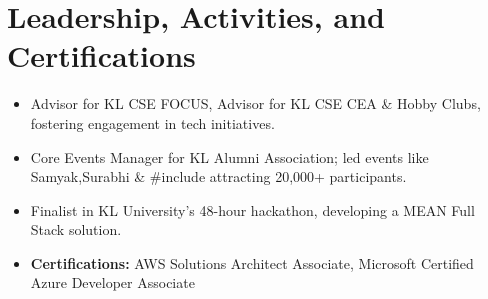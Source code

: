 \documentclass[10pt, letterpaper]{article}
\newenvironment{highlights}{
    \begin{itemize}[
        topsep=0.10 cm,
        parsep=0.10 cm,
        partopsep=0pt,
        itemsep=0pt,
        leftmargin=0 cm + 10pt
    ]
}{
    \end{itemize}
} %
\begin{document}
\section{Leadership, Activities, and Certifications}
\begin{highlights}
    \item Advisor for KL CSE FOCUS, Advisor for KL CSE CEA \& Hobby Clubs, fostering engagement in tech initiatives.
    \item Core Events Manager for KL Alumni Association; led events like Samyak,Surabhi \& \#include attracting 20,000+ participants.
    \item Finalist in KL University's 48-hour hackathon, developing a MEAN Full Stack solution.
    \item \textbf{Certifications:} AWS Solutions Architect Associate, Microsoft Certified Azure Developer Associate
\end{highlights}
    
\end{document}
